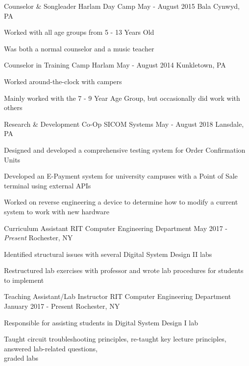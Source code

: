 \begin{cventries}
	\cventry
		{Counselor \& Songleader}
		{Harlam Day Camp}
		{May - August 2015}
		{Bala Cynwyd, PA}
		{
			\begin{cvitems}
			\item {Worked with all age groups from 5 - 13 Years Old}
			\item {Was both a normal counselor and a music teacher}
			\end{cvitems}
		}

	\cventry
		{Counselor in Training}
		{Camp Harlam}
		{May - August 2014}
		{Kunkletown, PA}
		{
			\begin{cvitems}
			\item {Worked around-the-clock with campers}
			\item {Mainly worked with the 7 - 9 Year Age Group, but occasionally did work with others}
			\end{cvitems}
		}
	\cventry
		{Research \& Development Co-Op}
		{SICOM Systems}
		{May - August 2018}
		{Lansdale, PA}
		{
			\begin{cvitems}
			\item {Designed and developed a comprehensive testing system for Order Confirmation Units}
			\item {Developed an E-Payment system for university campuses with a Point of Sale terminal using external APIs}
			\item {Worked on reverse engineering a device to determine how to modify a current system to work with new hardware}
			\end{cvitems}
		}
	\cventry
		{Curriculum Assistant}
		{RIT Computer Engineering Department}
		{May 2017 - \textit{Present}}
		{Rochester, NY}
		{
			\begin{cvitems}
			\item {Identified structural issues with several Digital System Design II labs}
			\item {Restructured lab exercises with professor and wrote lab procedures for students to implement}
			\end{cvitems}
		}

	\cventry
		{Teaching Assistant/Lab Instructor}
		{RIT Computer Engineering Department}
		{January 2017 - Present}
		{Rochester, NY}
		{
			\begin{cvitems}
			\item{Responsible for assisting students in Digital System Design I lab}
			\item{Taught circuit troubleshooting principles, re-taught key lecture principles, answered lab-related questions, \\graded labs}
			\end{cvitems}
		}

\end{cventries}
